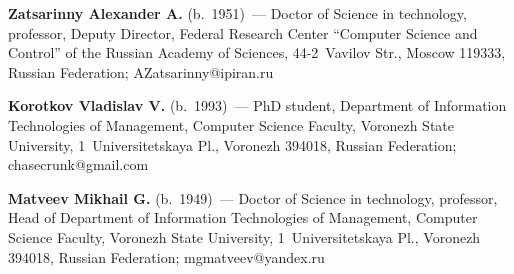   \Contr
  
  \noindent
  \textbf{Zatsarinny Alexander A.} (b.\ 1951)~--- Doctor of Science in 
technology, professor, Deputy Director, Federal Research Center ``Computer 
Science and Control'' of the Russian Academy of Sciences, 44-2~Vavilov Str., 
Moscow 119333, Russian Federation; \mbox{AZatsarinny@ipiran.ru}
  
  \vspace*{3pt}
  
  \noindent
  \textbf{Korotkov Vladislav V.} (b.\ 1993)~--- PhD student, Department of 
Information Technologies of Management, Computer Science Faculty, Voronezh 
State University, 1~Universitetskaya Pl., Voronezh 394018, Russian Federation; 
\mbox{chasecrunk@gmail.com}
  
  \vspace*{3pt}
  
  \noindent
  \textbf{Matveev Mikhail G.} (b.\ 1949)~--- Doctor of Science in technology, 
professor, Head of Department of Information Technologies of 
Management, Computer Science Faculty, Voronezh State University, 
1~Universitetskaya Pl., Voronezh 394018, Russian Federation; 
\mbox{mgmatveev@yandex.ru}
\label{end\stat}

\renewcommand{\bibname}{\protect\rm Литература}  